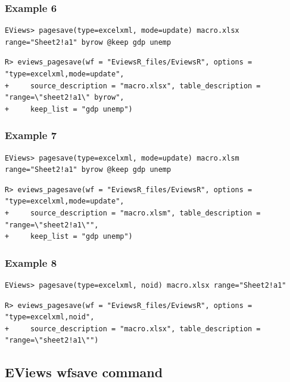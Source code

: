 \hypertarget{example-6-3}{%
\subsubsection{Example 6}\label{example-6-3}}

\begin{verbatim}
EViews> pagesave(type=excelxml, mode=update) macro.xlsx range="Sheet2!a1" byrow @keep gdp unemp
\end{verbatim}

\begin{verbatim}
R> eviews_pagesave(wf = "EviewsR_files/EviewsR", options = "type=excelxml,mode=update",
+     source_description = "macro.xlsx", table_description = "range=\"sheet2!a1\" byrow",
+     keep_list = "gdp unemp")
\end{verbatim}

\hypertarget{example-7-3}{%
\subsubsection{Example 7}\label{example-7-3}}

\begin{verbatim}
EViews> pagesave(type=excelxml, mode=update) macro.xlsm range="Sheet2!a1" byrow @keep gdp unemp
\end{verbatim}

\begin{verbatim}
R> eviews_pagesave(wf = "EviewsR_files/EviewsR", options = "type=excelxml,mode=update",
+     source_description = "macro.xlsm", table_description = "range=\"sheet2!a1\"",
+     keep_list = "gdp unemp")
\end{verbatim}

\hypertarget{example-8-3}{%
\subsubsection{Example 8}\label{example-8-3}}

\begin{verbatim}
EViews> pagesave(type=excelxml, noid) macro.xlsx range="Sheet2!a1"
\end{verbatim}

\begin{verbatim}
R> eviews_pagesave(wf = "EviewsR_files/EviewsR", options = "type=excelxml,noid",
+     source_description = "macro.xlsx", table_description = "range=\"sheet2!a1\"")
\end{verbatim}

\hypertarget{eviews-wfsave-command}{%
\subsection{EViews wfsave command}\label{eviews-wfsave-command}}

